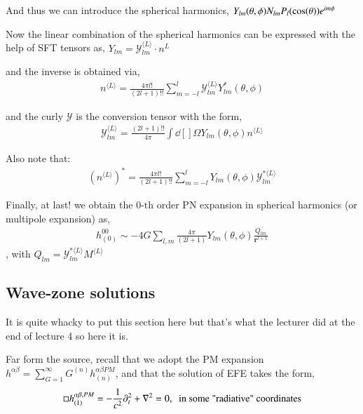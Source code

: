 \documentclass[a4paper, 12pt]{article}
\begin{document}
 And thus we can introduce the spherical harmonics, \(
 Y_{lm}(\theta, \phi) N_{lm} P_{l} ( \mathrm{cos}\hspace{0.0cm}(\theta))
 e^{im\phi} \) 

 Now the linear combination of the spherical harmonics can be expressed
 with the help of SFT tensors as, \( Y_{lm} =
 \mathcal{Y}_{lm}^{\langle L \rangle  }\cdot n^{L}  \) 

 and the inverse is obtained via, 
 \begin{align}
  \label{inverse spherical}
   n^{\langle L \rangle} = \frac{4\pi l!}{(2l+1)!!} \sum_{m=-l}^{l}
   \mathcal{Y}_{lm}^{\langle L \rangle  } Y_{lm}^{*}(\theta, \phi)
 \end{align}

 and the curly \( \mathcal{Y} \) is the conversion tensor with the form, 
 \begin{align}
  \label{conversion tensor}
   \mathcal{Y}_{lm}^{\langle L \rangle } = \frac{(2l+1)!!}{4\pi} \int
   \dd[]{\Omega} Y_{lm} (\theta, \phi) n^{\langle L \rangle} 
 \end{align}

 Also note that:
\begin{align}
  \label{conjugate inverse spherical}
    (n^{\langle L \rangle})^* = \frac{4\pi l!}{(2l+1)!!} \sum_{m=-l}^{l}
  Y_{lm}^{}(\theta, \phi) \mathcal{Y}_{lm}^{ *  \langle L \rangle  } 
\end{align}

Finally, at last! we obtain the 0-th order PN expansion in spherical
harmonics (or multipole expansion) as, 
\begin{align}
  \label{final PN 0th expansion }
  h_{(0)}^{00} \sim -4 G \sum_{l,m}^{  } \frac{4\pi}{(2l+1)}
  Y_{lm}(\theta, \phi ) \frac{Q_{lm}}{\textbf{r}^{l+1} }
\end{align}, with \( Q_{lm} = \mathcal{Y}_{lm}^{ * \langle L \rangle  }
M^{\langle L \rangle} \)

\subsection{Wave-zone solutions}%
  \label{sub:Wave-zone solutions}
  It is quite whacky to put this section here but that's what the lecturer
  did at the end of lecture 4 so here it is. 

  Far form the source, recall that we adopt the PM expansion \( h^{\alpha
  \beta} = \sum_{G=1}^{\infty} G^{(n)} h_{(n)}^{\alpha\beta PM}   \), and
  that the solution of EFE takes the form, 
  \begin{align}
    \label{revisting wavezone}
    \Box h_{(1)}^{\alpha\beta, PM} = - \frac{1}{c^2}
    \partial_{t}^{2} + \nabla^{2} = 0, \hspace{0.1cm}\textnormal{ in some
    "radiative" coordinates} 
  \end{align}
\end{document}
